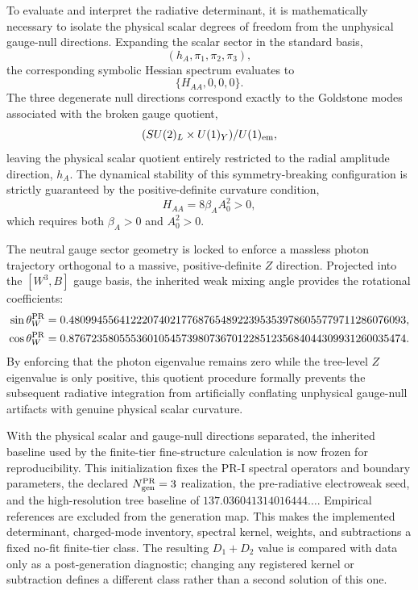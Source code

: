 \documentclass[11pt]{article}
\begin{document}
To evaluate and interpret the radiative determinant, it is mathematically necessary to isolate the physical scalar degrees of freedom from the unphysical gauge-null directions. Expanding the scalar sector in the standard basis,
\begin{equation}
(h_A,\pi_1,\pi_2,\pi_3),
\end{equation}
the corresponding symbolic Hessian spectrum evaluates to
\begin{equation}
\{H_{AA},0,0,0\}.
\end{equation}
The three degenerate null directions correspond exactly to the Goldstone modes associated with the broken gauge quotient,
\begin{equation}
(SU(2)_L\times U(1)_Y)/U(1)_{\rm em},
\end{equation}
leaving the physical scalar quotient entirely restricted to the radial amplitude direction, $h_A$. The dynamical stability of this symmetry-breaking configuration is strictly guaranteed by the positive-definite curvature condition,
\begin{equation}
H_{AA}=8\beta_A A_0^2>0,
\end{equation}
which requires both $\beta_A>0$ and $A_0^2>0$.

The neutral gauge sector geometry is locked to enforce a  massless photon trajectory orthogonal to a massive, positive-definite $Z$ direction. Projected into the $[W^3,B]$ gauge basis, the inherited weak mixing angle provides the rotational coefficients:
\begin{align}
\sin\theta_W^{\rm PR}&=0.480994556412220740217768765489223953539786055779711286076093,\\
\cos\theta_W^{\rm PR}&=0.876723580555360105457398073670122851235684044309931260035474.
\end{align}
By enforcing that the photon eigenvalue remains zero while the tree-level $Z$ eigenvalue is only positive, this quotient procedure formally prevents the subsequent radiative integration from artificially conflating unphysical gauge-null artifacts with genuine physical scalar curvature.

With the physical scalar and gauge-null directions separated, the inherited
baseline used by the finite-tier fine-structure calculation is now frozen for reproducibility.  This initialization fixes the PR-I spectral operators and boundary parameters, the declared $N_{\rm gen}^{\rm PR}=3$ realization, the pre-radiative electroweak seed, and the high-resolution tree baseline of $137.036041314016444\ldots$.  Empirical references are excluded from the generation map.  This makes the implemented determinant, charged-mode inventory, spectral kernel, weights, and subtractions a fixed no-fit finite-tier class.  The resulting $D_1+D_2$ value is compared with data only as a post-generation diagnostic; changing any registered kernel or subtraction defines a different class rather than a second solution of this one.
\end{document}
